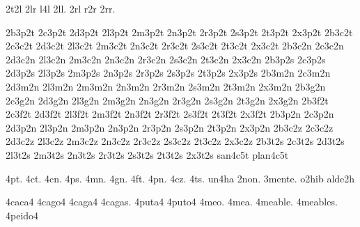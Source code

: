 {2t2l 
2lr l4l 2ll. 2rl r2r 2rr. 

2b3p2t 2c3p2t 2d3p2t 2l3p2t 2m3p2t 2n3p2t 2r3p2t 2s3p2t 2t3p2t 2x3p2t 
2b3c2t 2c3c2t 2d3c2t 2l3c2t 2m3c2t 2n3c2t 2r3c2t 2s3c2t 2t3c2t 2x3c2t 
2b3c2n 2c3c2n 2d3c2n 2l3c2n 2m3c2n 2n3c2n 2r3c2n 2s3c2n 2t3c2n 2x3c2n 
2b3p2s 2c3p2s 2d3p2s 2l3p2s 2m3p2s 2n3p2s 2r3p2s 2s3p2s 2t3p2s 2x3p2s 
2b3m2n 2c3m2n 2d3m2n 2l3m2n 2m3m2n 2n3m2n 2r3m2n 2s3m2n 2t3m2n 2x3m2n 
2b3g2n 2c3g2n 2d3g2n 2l3g2n 2m3g2n 2n3g2n 2r3g2n 2s3g2n 2t3g2n 2x3g2n 
2b3f2t 2c3f2t 2d3f2t 2l3f2t 2m3f2t 2n3f2t 2r3f2t 2s3f2t 2t3f2t 2x3f2t 
2b3p2n 2c3p2n 2d3p2n 2l3p2n 2m3p2n 2n3p2n 2r3p2n 2s3p2n 2t3p2n 2x3p2n 
2b3c2z 2c3c2z 2d3c2z 2l3c2z 2m3c2z 2n3c2z 2r3c2z 2s3c2z 2t3c2z 2x3c2z 
2b3t2s 2c3t2s 2d3t2s 2l3t2s 2m3t2s 2n3t2s 2r3t2s 2s3t2s 2t3t2s 2x3t2s 
san4c5t plan4c5t 

4pt. 4ct. 4cn. 4ps. 4mn. 4gn. 4ft. 4pn. 4cz. 4ts. 
un4ha 2non. 3mente. o2hib alde2h 

4caca4 4cago4 4caga4 4cagas. 4puta4 4puto4 4meo. 4mea. 
4meable. 4meables. 4peido4 

}
